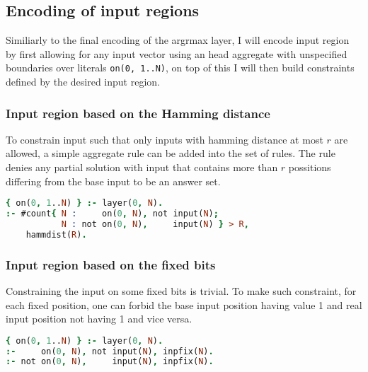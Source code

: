 \subsection{Encoding of input regions}

Similiarly to the final encoding of the argrmax layer, I will encode input region
by first allowing for any input vector using an head aggregate with unspecified boundaries
over literals \texttt{on(0, 1..N)}, on top of this I will then build constraints %
defined by the desired input region.

\subsubsection{Input region based on the Hamming distance}

To constrain input such that only inputs with hamming distance at most $r$ are allowed,
a simple aggregate rule can be added into the set of rules.
The rule denies any partial solution with input that contains more than $r$ possitions
differing from the base input to be an answer set.

\begin{code}
\begin{lstlisting}[language=Prolog, numbers=none]
{ on(0, 1..N) } :- layer(0, N).
:- #count{ N :     on(0, N), not input(N);
           N : not on(0, N),     input(N) } > R,
    hammdist(R).
\end{lstlisting}
    \caption{Encoding of input region based on Hamming distance}\label{enc:hamming}
\end{code}

\subsubsection{Input region based on the fixed bits}

Constraining the input on some fixed bits is trivial. To make such constraint,
for each fixed position, one can forbid the base input position having value 1
and real input position not having 1 and vice versa.

\begin{code}
\begin{lstlisting}[language=Prolog, numbers=none]
{ on(0, 1..N) } :- layer(0, N).
:-     on(0, N), not input(N), inpfix(N).
:- not on(0, N),     input(N), inpfix(N).
\end{lstlisting}
    \caption{Encoding of input region based on fixed bits using constraints on input}\label{enc:fixed_bits}
\end{code}

